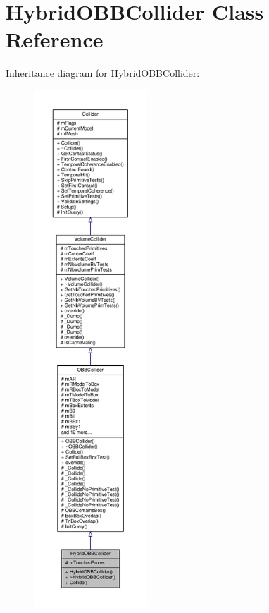 \hypertarget{classHybridOBBCollider}{}\section{Hybrid\+O\+B\+B\+Collider Class Reference}
\label{classHybridOBBCollider}


Inheritance diagram for Hybrid\+O\+B\+B\+Collider\+:
\nopagebreak
\begin{figure}[H]
\begin{center}
\leavevmode
\includegraphics[height=550pt]{da/db1/classHybridOBBCollider__inherit__graph}
\end{center}
\end{figure}


